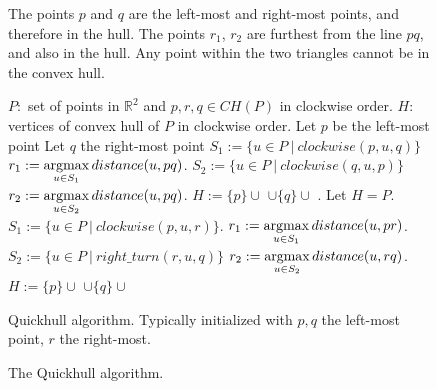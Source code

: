 \begin{figure}[ht]
\begin{minipage}[t]{0.49\textwidth}
{
    }
    \caption{The points $p$ and $q$ are the left-most and 
             right-most points, and therefore in the hull. The points $r_1$,
             $r_2$ are furthest from the line $pq$, and also in the hull. Any
             point within the two triangles cannot be in the convex hull.}
    \label{fig:quickhull}
    \end{minipage}
    \hfill
    \begin{minipage}{0.49\textwidth}
    \begin{algorithm}[H] %
    \begin{algorithmic}[1]
        \Require $P: $ set of points in $\mathbb{R}^2$ 
            and $p, r, q \in CH(P)$ in clockwise order.
        \Ensure $H: $ vertices of convex hull of $P$ in clockwise order.
        \State Let $p$ be the left-most point
        \State Let $q$ the right-most point
        \State $S_1 := \{u \in P \ | \ clockwise(p, u, q)\}$
        \State $r_1 := \operatorname*{argmax}\limits_{u \in S_1}distance(u, pq)$.
        \State $S_2 := \{u \in P \ | \ clockwise(q, u, p)\}$
        \State $r_2 := \operatorname*{argmax}\limits_{u \in S_2}distance(u, pq)$.
        \State $H := \{p\} \cup $ 
                $\cup \{q\} \cup$ .
                \State Let $H = P$.
            \Else{}
                \State $S_1 := \{u \in P \ | \ clockwise(p, u, r)\}$.
                \State $r_1 := \operatorname*{argmax}\limits_{u \in S_1}distance(u, pr)$.
                \State $S_2 := \{u \in P \ | \ right\_turn(r, u, q)\}$
                \State $r_2 := \operatorname*{argmax}\limits_{u \in S_2}distance(u, rq)$.
                \State $H := \{p\} \cup $ 
                       $\cup \{q\} \cup$ 
            \EndIf
        \EndFunction
    \end{algorithmic}
    \caption{Quickhull algorithm. Typically initialized with $p, q$ the 
             left-most point, $r$ the right-most.}
    \label{alg:quickhull_basic}
    \end{algorithm}
    \end{minipage}
    \caption{The Quickhull algorithm. }
\end{figure}

